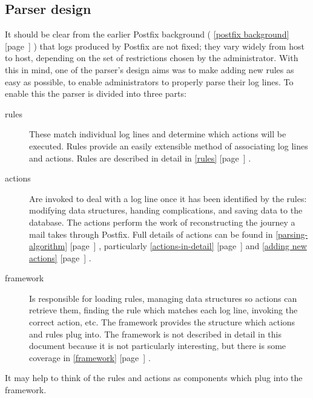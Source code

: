 \documentclass[a4paper,12pt,draft]{article}
\newcommand{\refwithpage}[1]{%
    \empty{}\ref{#1} [page~\pageref{#1}]%
}
\newcommand{\sectionref}[1]{%
    \textsection{}\refwithpage{#1}%
}
\begin{document}
\subsection{Parser design}

\label{parser design}

It should be clear from the earlier Postfix background (\sectionref{postfix
background}) that logs produced by Postfix are not fixed; they vary widely
from host to host, depending on the set of restrictions chosen by the
administrator.  With this in mind, one of the parser's design aims was to
make adding new rules as easy as possible, to enable administrators to
properly parse their log lines.  To enable this the parser is divided into
three parts:

\begin{description}

    \item [rules] These match individual log lines and determine which
        actions will be executed.  Rules provide an easily extensible
        method of associating log lines and actions.  Rules are described
        in detail in \sectionref{rules}.

    \item [actions] Are invoked to deal with a log line once it has been
        identified by the rules: modifying data structures, handing
        complications, and saving data to the database.  The actions
        perform the work of reconstructing the journey a mail takes through
        Postfix.  Full details of actions can be found in
        \sectionref{parsing-algorithm}, particularly
        \sectionref{actions-in-detail} and \sectionref{adding new actions}.

    \item [framework] Is responsible for loading rules, managing data
        structures so actions can retrieve them, finding the rule which
        matches each log line, invoking the correct action, etc.  The
        framework provides the structure which actions and rules plug into.
        The framework is not described in detail in this document because
        it is not particularly interesting, but there is some coverage in
        \sectionref{framework}.

\end{description}

It may help to think of the rules and actions as components which plug into
the framework.  

\label{why separate rules, actions and framework?}
\end{document}
